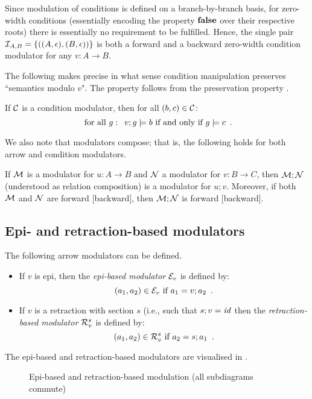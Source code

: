 Since modulation of conditions is defined on a branch-by-branch basis, for zero-width conditions (essentially encoding the property $\textbf{false}$ over their respective roots) there is essentially no requirement to be fulfilled. Hence, the single pair $\mathcal{I}_{A,B}=\{{((A,\epsilon),(B,\epsilon))}\}$ is both a forward and a backward zero-width condition modulator for any $v:A\to B$.

The following makes precise in what sense condition manipulation preserves ``semantics modulo $v$". The property follows from the preservation property .
%
\begin{proposition}
If $\mathcal{C}$ is a condition modulator, then for all $(b,c)\in \mathcal{C}$:
\[ \text{ for all } g: \enspace v;g\models b \text{ if and only if } g\models c \enspace. \]
\end{proposition}
%
We also note that modulators compose; that is, the following holds for both arrow and condition modulators.
%
\begin{proposition}
If $\mathcal{M}$ is a modulator for $u:A\to B$ and $\mathcal{N}$ a modulator for $v:B\to C$, then $\mathcal{M};\mathcal{N}$(understood as relation composition) is a modulator for $u;v$. Moreover, if both $\mathcal{M}$ and $\mathcal{N}$ are forward [backward], then $\mathcal{M};\mathcal{N}$ is forward [backward].
\end{proposition}


\subsection{Epi- and retraction-based modulators}

The following arrow modulators can be defined.

\begin{itemize}
\item If $v$ is epi, then the \emph{epi-based modulator} $\mathcal{E}_v$ is defined by:
\[ (a_1,a_2)\in \mathcal{E}_v \text{ if } a_1=v;a_2 \enspace.
\]
\item If $v$ is a retraction with section $s$ (i.e., such that $s;v=\mathit{id}$ then the \emph{retraction-based modulator} $\mathcal{R}_v^s$ is defined by:
\[ (a_1,a_2)\in \mathcal{R}_v^s \text{ if } a_2=s;a_1 \enspace.
\]
\end{itemize}
%
The epi-based and retraction-based modulators are visualised in .
%
\begin{figure}
\centering

\caption{Epi-based and retraction-based modulation (all subdiagrams commute)}
\end{figure}

